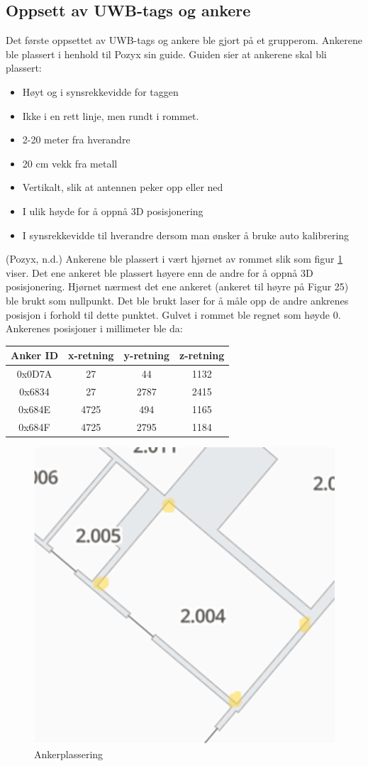 
\subsection{Oppsett av UWB-tags og ankere}
Det første oppsettet av UWB-tags og ankere ble gjort på et grupperom. Ankerene ble plassert i henhold til Pozyx sin guide. 
Guiden sier at ankerene skal bli plassert:
\begin{itemize}
\item Høyt og i synsrekkevidde for taggen
\item Ikke i en rett linje, men rundt i rommet.
\item 2-20 meter fra hverandre
\item 20 cm vekk fra metall
\item Vertikalt, slik at antennen peker opp eller ned
\item I ulik høyde for å oppnå 3D posisjonering
\item I synsrekkevidde til hverandre dersom man ønsker å bruke auto kalibrering
\end{itemize}


(Pozyx, n.d.)
Ankerene ble plassert i vært hjørnet av rommet slik som figur \ref{fig:ankerplassering} viser. 
Det ene ankeret ble plassert høyere enn de andre for å oppnå 3D posisjonering.
Hjørnet nærmest det ene ankeret (ankeret til høyre på Figur 25) ble brukt som nullpunkt. 
Det ble brukt laser for å måle opp de andre ankrenes posisjon i forhold til dette punktet. 
Gulvet i rommet ble regnet som høyde 0. Ankerenes posisjoner i millimeter ble da:

\begin{center}
\begin{tabular}{||c c c c||} 
 \hline
 Anker ID & x-retning & y-retning & z-retning \\ [0.5ex] 
 \hline\hline
 0x0D7A & 27 & 44 & 1132 \\ 
 \hline
 0x6834 & 27 & 2787 & 2415 \\
 \hline
 0x684E & 4725 & 494 & 1165 \\
 \hline
 0x684F & 4725 & 2795 & 1184 \\ [1ex] 
 \hline
\end{tabular}
\end{center}

\begin{figure}[htp]
\centering
\includegraphics[width=0.5\columnwidth]{figures/ankerplassering}
\caption{Ankerplassering}
\label{fig:ankerplassering}
\end{figure}

